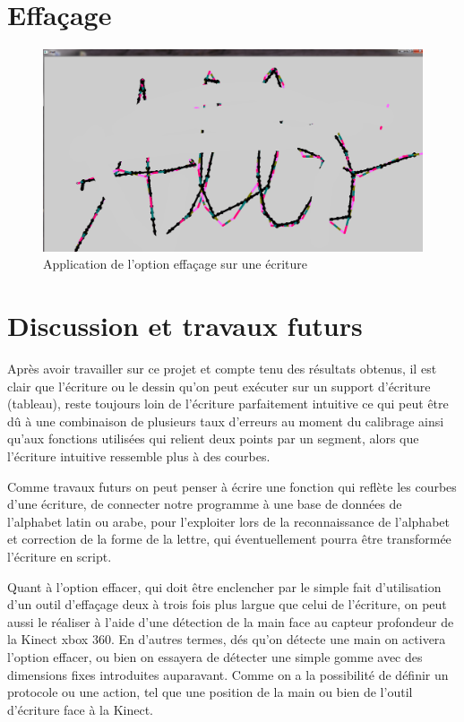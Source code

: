 \documentclass[12pt,a4paper,oneside]{book}
\begin{document}
	\section{Effaçage}
		\begin{figure}[H]
			\centering
			\includegraphics[scale=0.45]{ef1.png}
			\caption{ Application de l'option effaçage sur une écriture}
			
		\end{figure}
	
	\section{Discussion et travaux futurs}
	Après avoir travailler sur ce projet et compte tenu des résultats obtenus, il est clair que l'écriture ou le dessin qu'on peut exécuter sur un support d'écriture (tableau), reste toujours loin de l'écriture parfaitement intuitive ce qui peut être dû à une combinaison  de plusieurs taux d'erreurs au moment du calibrage ainsi qu'aux fonctions utilisées qui relient deux points par un segment, alors que l'écriture intuitive ressemble plus à des courbes.  
	
	Comme travaux futurs on peut penser à écrire une fonction qui reflète les courbes d'une écriture, de connecter notre programme à une base de données de l'alphabet latin ou arabe, pour l'exploiter lors de la reconnaissance de l'alphabet et correction de la forme de la lettre, qui éventuellement pourra être transformée l'écriture en script.
	
	Quant à l'option effacer, qui doit être enclencher par le simple fait d'utilisation d'un outil d'effaçage deux à trois fois plus largue que celui de l'écriture, on peut aussi le réaliser à l'aide d'une détection de la main face au capteur profondeur de la Kinect xbox 360. En d'autres termes, dés qu'on détecte une main on activera l'option effacer, ou bien on essayera de détecter une simple gomme avec des dimensions fixes introduites auparavant. Comme on a la possibilité de définir un protocole ou une action, tel que une position de la main ou bien de l'outil d'écriture face à la Kinect.%
	
\end{document}
